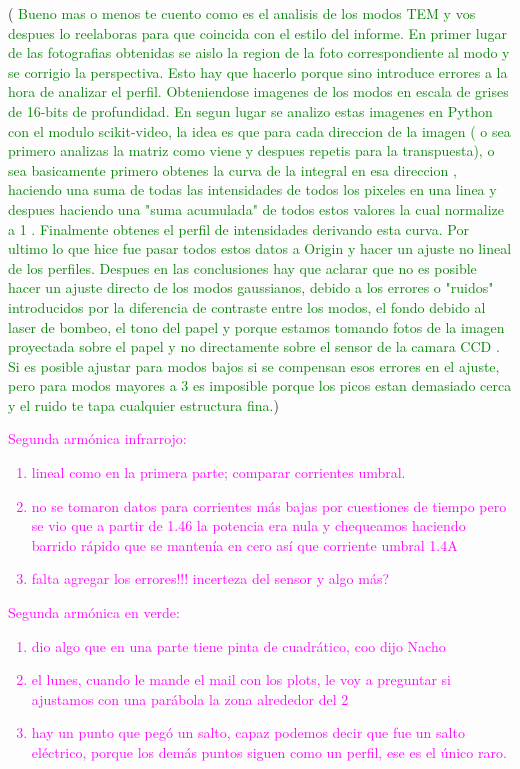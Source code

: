 \documentclass[10pt, a4paper]{article}%
\begin{document}
\begin{multicols}{2}
(\textcolor{Green}{ Bueno mas o menos te cuento como es el analisis de los modos TEM y vos despues lo reelaboras para que coincida con el estilo del informe. \newline En primer lugar de las fotografias obtenidas se aislo la region de la foto correspondiente al modo y se corrigio la perspectiva. Esto hay que hacerlo porque sino introduce errores a la hora de analizar el perfil. Obteniendose imagenes de los modos en escala de grises de 16-bits de profundidad. En segun lugar se analizo estas imagenes en Python con el modulo scikit-video, la idea es que para cada direccion de la imagen ( o sea primero analizas la matriz como viene y despues repetis para la transpuesta), o sea basicamente primero obtenes la curva de la integral en esa direccion , haciendo una suma de todas las intensidades de todos los pixeles en una linea y despues haciendo una "suma acumulada" de todos estos valores la cual normalize a 1 . Finalmente obtenes el perfil de intensidades derivando esta curva. Por ultimo lo que hice fue pasar todos estos datos a Origin y hacer un ajuste no lineal de los perfiles. Despues en las conclusiones hay que aclarar que no es posible hacer un ajuste directo de los modos gaussianos, debido a los errores o "ruidos" introducidos por la diferencia de contraste entre los modos, el fondo debido al laser de bombeo, el tono del papel y porque estamos tomando fotos de la imagen proyectada sobre el papel y no directamente sobre el sensor de la camara CCD . Si es posible ajustar para modos bajos si se compensan esos errores en el ajuste, pero para modos mayores a 3 es imposible porque los picos estan demasiado cerca y el ruido te tapa cualquier estructura fina.})


\textcolor{magenta}{Segunda armónica infrarrojo:
\begin{enumerate}
    \item lineal como en la primera parte; comparar corrientes umbral.
    \item no se tomaron datos para corrientes más bajas por cuestiones de tiempo pero se vio que a partir de 1.46 la potencia era nula y chequeamos haciendo barrido rápido que se mantenía en cero así que corriente umbral 1.4A
    \item falta agregar los errores!!! incerteza del sensor y algo más?
\end{enumerate}}
\textcolor{magenta}{
Segunda armónica en verde:
\begin{enumerate}
    \item dio algo que en una parte tiene pinta de cuadrático, coo dijo Nacho
    \item el lunes, cuando le mande el mail con los plots, le voy a preguntar si ajustamos con una parábola la zona alrededor del 2
    \item hay un punto que pegó un salto, capaz podemos decir que fue un salto eléctrico, porque los demás puntos siguen como un perfil, ese es el único raro.
\end{enumerate}
}








\end{multicols}
\end{document}
